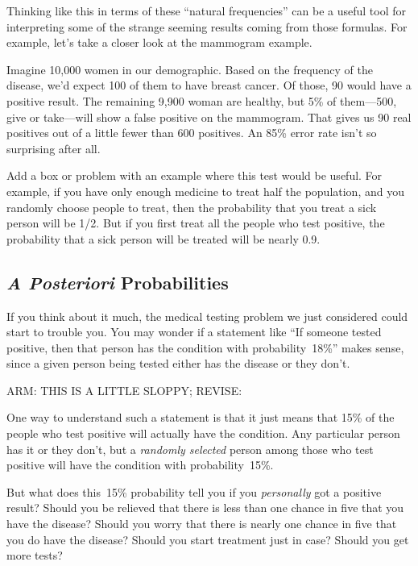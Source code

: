 Thinking like this in terms of these ``natural frequencies'' can be a
useful tool for interpreting some of the strange seeming results
coming from those formulas.  For example, let's take a closer look at
the mammogram example.

Imagine 10,000 women in our demographic.  Based on the frequency of
the disease, we'd expect 100 of them to have breast cancer.  Of those,
90 would have a positive result.  The remaining 9,900 woman are
healthy, but 5\% of them---500, give or take---will show a false
positive on the mammogram.  That gives us 90 real positives out of a
little fewer than 600 positives.  An 85\% error rate isn't so
surprising after all.

\begin{editingnotes}
Add a box or problem with an example where this test would be useful.
For example, if you have only enough medicine to treat half the
population, and you randomly choose people to treat, then the
probability that you treat a sick person will be 1/2.  But if you
first treat all the people who test positive, the probability that a
sick person will be treated will be nearly 0.9.
\end{editingnotes}


\subsection{\emph{A Posteriori} Probabilities}\label{aposteriori_subsec}

If you think about it much, the medical testing problem we just
considered could start to trouble you.  You may wonder if a statement
like ``If someone tested positive, then that person has the condition
with probability~18\%'' makes sense, since a given person being tested
either has the disease or they don't.

\begin{editingnotes}
ARM: THIS IS A LITTLE SLOPPY; REVISE:
\end{editingnotes}

One way to understand such a statement is that it just means that 15\%
of the people who test positive will actually have the condition.  Any
particular person has it or they don't, but a \emph{randomly selected}
person among those who test positive will have the condition with
probability~15\%.

But what does this~15\% probability tell you if you \emph{personally}
got a positive result?  Should you be relieved that there is less than
one chance in five that you have the disease?  Should you worry that
there is nearly one chance in five that you do have the disease?
Should you start treatment just in case?  Should you get more tests?

